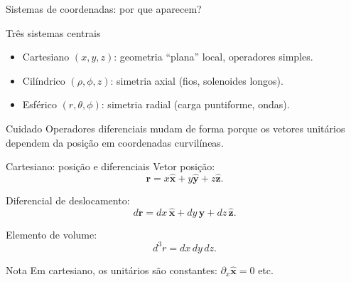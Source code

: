 \documentclass[aspectratio=169]{beamer}
\newcommand{\red}[1]{\textcolor{myred}{#1}}
\begin{document}
\begin{frame}{Sistemas de coordenadas: por que aparecem?}
\begin{block}{Três sistemas centrais}
\begin{itemize}
  \item Cartesiano $(x,y,z)$: geometria ``plana'' local, operadores simples.
  \item Cilíndrico $(\rho,\phi,z)$: simetria axial (fios, solenoides longos).
  \item Esférico $(r,\theta,\phi)$: simetria radial (carga puntiforme, ondas).
\end{itemize}
\end{block}

\begin{alertblock}{Cuidado}
Operadores diferenciais mudam de forma porque os vetores unitários \red{dependem da posição} em coordenadas curvilíneas.
\end{alertblock}
\end{frame}

\begin{frame}{Cartesiano: posição e diferenciais}
Vetor posição:
\begin{equation}
\bm r=x\hat{\bm x}+y\hat{\bm y}+z\hat{\bm z}.
\label{eq:r_cart}
\end{equation}

Diferencial de deslocamento:
\begin{equation}
d\bm r=dx\,\hat{\bm x}+dy\,\hat{\bm y}+dz\,\hat{\bm z}.
\label{eq:dr_cart}
\end{equation}

Elemento de volume:
\begin{equation}
d^3r=dx\,dy\,dz.
\label{eq:d3_cart}
\end{equation}

\begin{block}{Nota}
Em cartesiano, os unitários são constantes: $\partial_x\hat{\bm x}=0$ etc.
\end{block}
\end{frame}
\end{document}
